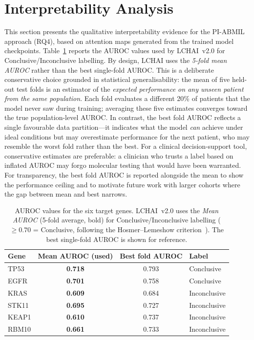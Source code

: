 \section{Interpretability Analysis}
\label{sec:eval:interpretability}

This section presents the qualitative interpretability evidence for the
PI-ABMIL approach (RQ4), based on attention maps
generated from the trained model checkpoints.
Table~\ref{tab:viz_folds} reports the AUROC values used by LCHAI~v2.0
for Conclusive/Inconclusive labelling.
By design, LCHAI uses the \emph{5-fold mean AUROC} rather than the
best single-fold AUROC.
This is a deliberate conservative choice grounded in statistical
generalisability: the mean of five held-out test folds is an estimator
of the \emph{expected performance on any unseen patient from the
same population}.
Each fold evaluates a different 20\% of patients that the model never
saw during training; averaging these five estimates converges toward
the true population-level AUROC.
In contrast, the best fold AUROC reflects a single favourable data
partition---it indicates what the model \emph{can} achieve under
ideal conditions but may overestimate performance for the next
patient, who may resemble the worst fold rather than the best.
For a clinical decision-support tool, conservative estimates are
preferable: a clinician who trusts a label based on inflated AUROC
may forgo molecular testing that would have been warranted.
For transparency, the best fold AUROC is reported alongside the mean
to show the performance ceiling and to motivate future work with
larger cohorts where the gap between mean and best narrows.

\begin{table}[ht!]
\centering
\small
\caption{AUROC values for the six target genes.
LCHAI~v2.0 uses the \emph{Mean AUROC} (5-fold average, bold) for
Conclusive/Inconclusive labelling ($\geq 0.70$ = Conclusive,
following the Hosmer--Lemeshow criterion~\cite{hosmer2000applied}).
The best single-fold AUROC is shown for reference.}
\label{tab:viz_folds}
\begin{tabular}{l c c l}
\hline
\textbf{Gene} & \textbf{Mean AUROC (used)} & \textbf{Best fold AUROC} & \textbf{Label} \\
\hline
TP53  & \textbf{0.718} & 0.793 & Conclusive \\
EGFR  & \textbf{0.701} & 0.758 & Conclusive \\
KRAS  & \textbf{0.609} & 0.684 & Inconclusive \\
STK11 & \textbf{0.695} & 0.727 & Inconclusive \\
KEAP1 & \textbf{0.610} & 0.737 & Inconclusive \\
RBM10 & \textbf{0.661} & 0.733 & Inconclusive \\
\hline
\end{tabular}
\end{table}


